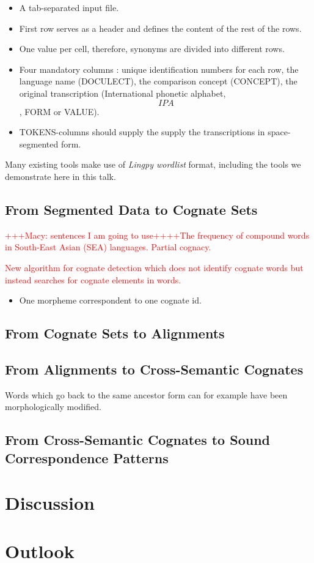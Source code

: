 \documentclass[xetex]{scrartcl}
\begin{document}
\begin{itemize}
\item A tab-separated input file. 
\item First row serves as a header and defines the content of the rest of the rows. 
\item One value per cell, therefore, synonyms are divided into different rows.
\item Four mandatory columns : unique identification numbers for each row, the language name (DOCULECT), the comparison concept (CONCEPT), the original transcription (International phonetic alphabet, \[IPA\], FORM or VALUE). 
\item TOKENS-columns should supply the supply the transcriptions in space-segmented form.
\end{itemize}

Many existing tools make use of \textit{Lingpy wordlist} format, including the tools we demonstrate here in this talk.

\subsection{From Segmented Data to Cognate Sets}



\textcolor{red}{+++Macy: sentences I am going to use++++The frequency of compound words in South-East Asian (SEA) languages. Partial cognacy.

New algorithm for cognate detection which does not identify cognate words but instead searches for cognate elements in words.}

\begin{itemize}
\item One morpheme correspondent to one cognate id.
\end{itemize}


\subsection{From Cognate Sets to Alignments}

\subsection{From Alignments to Cross-Semantic Cognates}
Words which go back to the same ancestor form can for example have been morphologically modified.
\subsection{From Cross-Semantic Cognates to Sound Correspondence Patterns}

\section{Discussion}

\section{Outlook}




\nocite{List2019a}

\printbibliography
\end{document}

